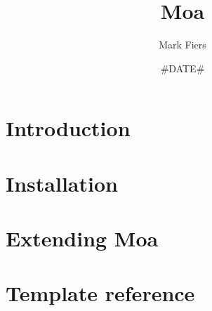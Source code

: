 \documentclass[a4paper,11pt,oneside]{report}
\begin{document}

\title{Moa}
\author{Mark Fiers}
\date{#DATE#}

\begin{titlepage}
\vfill
{}
\vfill
\vfill
{}
\end{titlepage}
\tableofcontents

\chapter{Introduction\label{ch:introduction}}

\chapter{Installation\label{ch:installation}}

\chapter{Extending Moa\label{ch:extending}}

\appendix
\chapter{Template reference\label{ch:templateref}}



\end{document}
